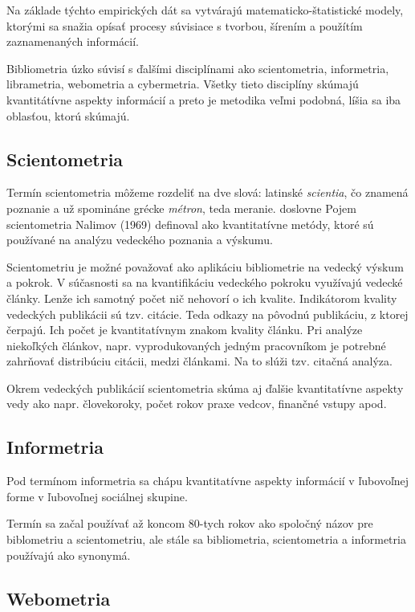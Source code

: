 Na základe týchto empirických dát sa vytvárajú matematicko-štatistické modely,
ktorými sa snažia opísať procesy súvisiace s tvorbou, šírením a použítím
zaznamenaných informácií.

Bibliometria úzko súvisí s ďalšími disciplínami ako scientometria, informetria,
librametria, webometria a cybermetria.  Všetky tieto disciplíny skúmajú
kvantitátívne aspekty informácií a preto je metodika veľmi podobná, líšia sa iba
oblasťou, ktorú skúmajú.


\subsection{Scientometria}

Termín scientometria môžeme rozdeliť na dve slová: latinské \emph{scientia}, čo znamená
poznanie a už spomináne grécke \emph{métron}, teda meranie.  doslovne  Pojem scientometria Nalimov (1969) definoval ako kvantitatívne
metódy, ktoré sú používané na analýzu vedeckého poznania a výskumu. 

Scientometriu je možné považovať ako aplikáciu bibliometrie na vedecký výskum a
pokrok.  V súčasnosti sa na kvantifikáciu vedeckého pokroku využívajú vedecké
články.  Lenže ich samotný počet nič nehovorí o ich kvalite.  Indikátorom
kvality vedeckých publikácii sú tzv. citácie.  Teda odkazy na pôvodnú
publikáciu, z ktorej čerpajú.  Ich počet je kvantitatívnym znakom kvality
článku.  Pri analýze niekoľkých článkov, napr. vyprodukovaných jedným
pracovníkom je potrebné zahrňovať distribúciu citácii, medzi článkami.  Na to
slúži tzv. citačná analýza.

Okrem vedeckých publikácií scientometria skúma aj ďalšie kvantitatívne aspekty
vedy ako napr. človekoroky, počet rokov praxe vedcov, finančné vstupy apod.
\citet{Bellis2009}


\subsection{Informetria}

Pod termínom informetria sa chápu kvantitatívne aspekty informácií v ľubovoľnej
forme v ľubovoľnej sociálnej skupine.

Termín sa začal používať až koncom 80-tych rokov ako spoločný názov pre
biblometriu a scientometriu, ale stále sa bibliometria, scientometria a
informetria používajú ako synonymá.


\subsection{Webometria}

